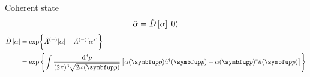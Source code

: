 \documentclass[aspectratio=169,usenames,dvipsnames]{beamer}
\begin{document}
	\begin{frame}{Coherent state}
		\begin{equation}
			\hat{\alpha}
			=
			\hat{D}\left[\alpha\right]
			\lvert0\rangle
		\end{equation}
		\begin{equation}
			\begin{split}
				\hat{D}\left[\alpha\right]
				&=
				\exp\biggl\{
					\hat{A}^{(+)}[\alpha]
					-
					\hat{A}^{(-)}[\alpha^*]
				\biggr\}
				\\
				&=
				\exp\left\{
					\int\frac{\dd[3]{p}}{(2\pi)^3\sqrt{2\omega(\vb{p})}}
					\left[
						\alpha(\vb{p})
						\hat{a}^\dagger(\vb{p})
						-
						\alpha(\vb{p})^*
						\hat{a}(\vb{p})
					\right]
				\right\}
			\end{split}
		\end{equation}
	\end{frame}
\end{document}
